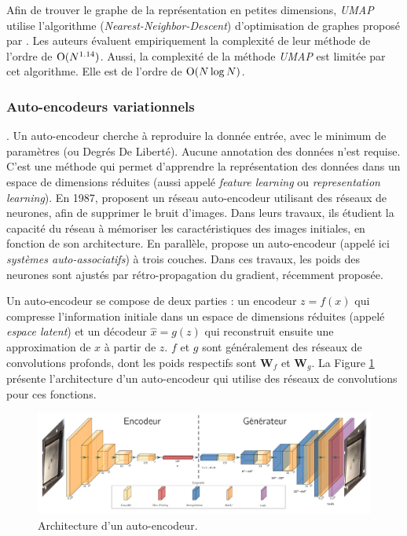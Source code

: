 Afin de trouver le graphe de la représentation en petites dimensions, \textit{UMAP} utilise l'algorithme (\textit{Nearest-Neighbor-Descent}) d'optimisation de graphes proposé par \cite{dong_efficient_2011}.
Les auteurs évaluent empiriquement la complexité de leur méthode de l'ordre de $\operatorname{O}(N^{1.14})$.
Aussi, la complexité de la méthode \textit{UMAP} est limitée par cet algorithme.
Elle est de l'ordre de $\operatorname{O}(N \log N)$.


\subsubsection{Auto-encodeurs variationnels} \label{subsubsec:vae}.
Un auto-encodeur cherche à reproduire la donnée entrée, avec le minimum de paramètres (ou Degrés De Liberté).
Aucune annotation des données n'est requise.
C'est une méthode qui permet d'apprendre la représentation des données dans un espace de dimensions réduites (aussi appelé \textit{feature learning} ou \textit{representation learning}).
En 1987, \cite{lecun_modeles_1987, gallinari_memoires_1987} proposent un réseau auto-encodeur utilisant des réseaux de neurones, afin de supprimer le bruit d'images.
Dans leurs travaux, ils étudient la capacité du réseau à mémoriser les caractéristiques des images initiales, en fonction de son architecture.
En parallèle, \cite{ballard_modular_1987} propose un auto-encodeur (appelé ici \textit{systèmes auto-associatifs}) à trois couches.
Dans ces travaux, les poids des neurones sont ajustés par rétro-propagation du gradient, récemment proposée.

Un auto-encodeur se compose de deux parties : un encodeur $z = f(x)$ qui compresse l'information initiale dans un espace de dimensions réduites (appelé \textit{espace latent}) et un décodeur $\hat x = g(z)$ qui reconstruit ensuite une approximation de $x$ à partir de $z$.
$f$ et $g$ sont généralement des réseaux de convolutions profonds, dont les poids respectifs sont $\mathbf{W}_f$ et $\mathbf{W}_g$.
La Figure \ref{fig:autoencoder_architecture} présente l'architecture d'un auto-encodeur qui utilise des réseaux de convolutions pour ces fonctions.

\begin{figure}[hbtp]
    \centering
    \includegraphics[width=\textwidth,height=\textheight,keepaspectratio]{../Chap3/Figures/autoencoder_architecture.pdf}
    \caption{Architecture d'un auto-encodeur.}
    \label{fig:autoencoder_architecture}
\end{figure}

